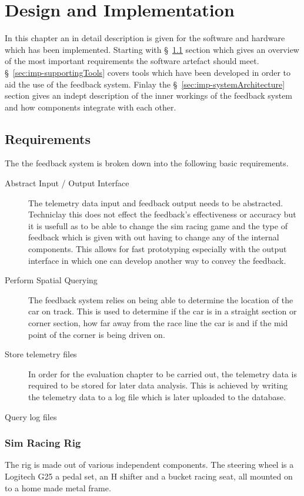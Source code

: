\section{Design and Implementation}
In this chapter an in detail description is given for the software and hardware which has been implemented. Starting with \S~\ref{sec:imp-requirements} section which gives an overview of the most important requirements the software artefact should meet. \S~\ref{sec:imp-supportingTools} covers tools which have been developed in order to aid the use of the feedback system. Finlay the \S~\ref{sec:imp-systemArchitecture} section gives an indept description of the inner workings of the feedback system and how components integrate with each other. 

\subsection{Requirements}
\label{sec:imp-requirements}
The the feedback system is broken down into the following basic requirements.

\begin{description}
	\item[Abstract Input / Output Interface] The telemetry data input and feedback output needs to be abstracted. Techniclay this does not effect the feedback's effectiveness or accuracy but it is usefull as to be able to change the sim racing game and the type of feedback which is given with out having to change any of the internal components. This allows for fast prototyping especially with the output interface in which one can develop another way to convey the feedback. 
	\item[Perform Spatial Querying] The feedback system relies on being able to determine the location of the car on track. This is used to determine if the car is in a straight section or corner section, how far away from the race line the car is and if the mid point of the corner is being driven on. 
	\item[Store telemetry files] In order for the evaluation chapter to be carried out, the telemetry data is required to be stored for later data analysis. This is achieved by writing the telemetry data to a log file which is later uploaded to the database.
	\item[Query log files]
\end{description}

\subsubsection{Sim Racing Rig}
\label{sec:imp-simRacingRig}
The rig is made out of various independent components. The steering wheel is a Logitech G25 a pedal set, an H shifter and a bucket racing seat, all mounted on to a home made metal frame.

